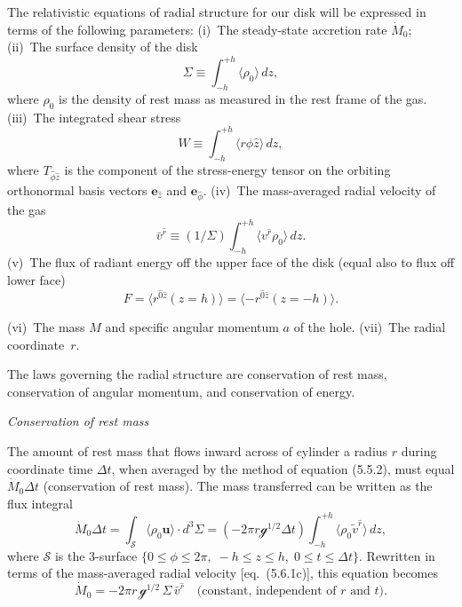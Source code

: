 The relativistic equations of radial structure for our disk will be expressed in
terms of the following parameters: (i)~The steady-state accretion rate $\dot{M}_0$;
(ii)~The surface density of the disk
\begin{equation}
\Sigma \equiv \int_{-h}^{+h} \langle \rho_0 \rangle\, dz,
\tag{5.6.1a}
\end{equation}
where $\rho_0$ is the density of rest mass as measured in the rest frame of the gas.
(iii)~The integrated shear stress
\begin{equation}
W \equiv \int_{-h}^{+h} \langle r\hat{\phi}\hat{z} \rangle\, dz,
\tag{5.6.1b}
\end{equation}
where $T_{\hat{\phi}\hat{z}}$ is the component of the stress-energy tensor on the orbiting ortho\-normal basis vectors $\mathbf{e}_{\hat{z}}$ and $\mathbf{e}_{\hat{\phi}}$.  (iv)~The mass-averaged radial velocity of the gas
\begin{equation}
\bar{v}^{\hat{r}} \equiv (1/\Sigma) \int_{-h}^{+h} \langle v^{\hat{r}} \rho_0 \rangle\, dz.
\tag{5.6.1c}
\end{equation}
(v)~The flux of radiant energy off the upper face of the disk (equal also to flux
off lower face)
\begin{equation}
F = \langle r^{\hat{0}\hat{z}}(z = h) \rangle
= \langle -r^{\hat{0}\hat{z}}(z = -h) \rangle.
\tag{5.6.1d}
\end{equation}

\noindent (vi)~The mass $M$ and specific angular momentum $a$ of the hole.  (vii)~The radial
coordinate~$r$.

The laws governing the radial structure are conservation of rest mass,
conservation of angular momentum, and conservation of energy.

\bigskip
\noindent\textit{Conservation of rest mass}

\medskip
The amount of rest mass that flows inward across of cylinder a radius $r$ during
coordinate time $\Delta t$, when averaged by the method of equation (5.5.2), must
equal $\dot{M}_0 \Delta t$ (conservation of rest mass).  The mass transferred can be written
as the flux integral
\begin{equation}
\dot{M}_0 \Delta t = \int_{\mathscr{S}} \langle \rho_0 \mathbf{u} \rangle \cdot d^3\Sigma
= (-2\pi r \mathscr{g}^{1/2} \Delta t)
\int_{-h}^{+h} \langle \rho_0 \tilde{v}^{\hat{r}} \rangle\, dz,
\tag{5.6.2}
\end{equation}
where $\mathscr{S}$ is the 3-surface $\{0 \leq \phi \leq 2\pi,\; -h \leq z \leq h,\; 0 \leq t \leq \Delta t\}$.
Rewritten in terms of the mass-averaged radial velocity [eq.\ (5.6.1c)], this equation becomes
\begin{equation}
\dot{M}_0 = -2\pi r\, \mathscr{g}^{1/2}\, \Sigma\, \bar{v}^{\hat{r}}
\quad \text{(constant, independent of $r$ and $t$)}.
\tag{5.6.2}
\end{equation}

